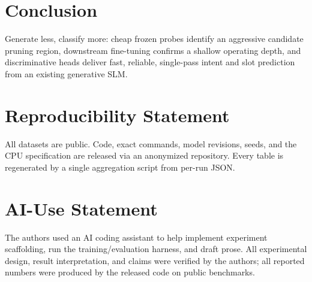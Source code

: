 \documentclass{article}
\begin{document}
\section{Conclusion}\label{sec:conclusion}
Generate less, classify more: cheap frozen probes identify an aggressive
candidate pruning region, downstream fine-tuning confirms a shallow operating
depth, and discriminative heads deliver fast, reliable, single-pass intent
and slot prediction from an existing generative SLM.

\section*{Reproducibility Statement}
All datasets are public. Code, exact commands, model revisions, seeds, and the
CPU specification are released via an anonymized repository. Every table is
regenerated by a single aggregation script from per-run JSON.

\section*{AI-Use Statement}
The authors used an AI coding assistant to help implement experiment scaffolding,
run the training/evaluation harness, and draft prose. All experimental design,
result interpretation, and claims were verified by the authors; all reported
numbers were produced by the released code on public benchmarks.



\end{document}
